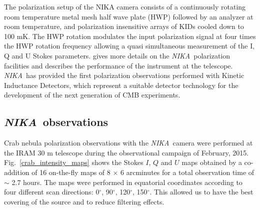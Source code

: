 \documentclass[twocolumn,traditabstract]{aa}
\def\NIKA{\textit{NIKA}}
\begin{document}
The polarization setup of the NIKA camera consists of a continuously rotating room temperature metal mesh half wave plate (HWP) followed by an analyzer at room temperature, and polarization insensitive arrays of KIDs cooled down to 100 mK. The HWP rotation modulates the input polarization signal at four times the HWP rotation frequency allowing a quasi simultaneous measurement of the I, Q and U Stokes parameters.
\cite{ritacco2017} gives more details on the \NIKA\ polarization facilities and describes the performance of the instrument at the telescope. 
\NIKA\ has provided the first polarization observations performed with Kinetic Inductance Detectors, which represent a suitable detector technology for the development of the next generation of CMB experiments.

\subsection{\NIKA\ observations}\label{sec:nika_observations}
Crab nebula polarization observations with the \NIKA\ camera were performed at the IRAM 30 m telescope during the observational campaign of February, 2015. Fig.~\ref{crab_intensity_maps} shows the Stokes $I$, $Q$ and $U$ maps obtained by a co-addition of 16 on-the-fly maps of 8 $\times$ 6 arcminutes for a total observation time of $\sim$ 2.7 hours. The maps were performed in equatorial coordinates according to four different scan directions: 0$^{\circ}$, 90$^{\circ}$, 120$^{\circ}$, 150$^{\circ}$. This allowed us to have the best covering of the source and to reduce
filtering effects.
\end{document}
